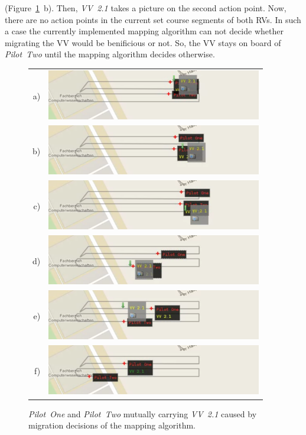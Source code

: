 (Figure~\ref{fig:demo2mig02}~b). Then, \textit{VV~2.1} takes a picture on the second action point.  
%
Now, there are no action points in the current set course segments of both \acp{RV}. In such a case
the currently implemented mapping algorithm can not decide whether migrating the \ac{VV} would be
benificious or not. So, the \ac{VV} stays on board of \textit{Pilot~Two} until the mapping algorithm
decides otherwise.
%
\begin{figure}[h]
	\begin{center}
		\begin{tabular}{rr}
			a)&{\includegraphics[width=9.4cm]{ese-demo2-3.png}} \\
			b)&{\includegraphics[width=9.4cm]{ese-demo2-4.png}} \\
			c)&{\includegraphics[width=9.4cm]{ese-demo2-5.png}} \\
			d)&{\includegraphics[width=9.4cm]{ese-demo2-6.png}} \\
			e)&{\includegraphics[width=9.4cm]{ese-demo2-7.png}} \\
			f)&{\includegraphics[width=9.4cm]{ese-demo2-8.png}}
		\end{tabular}
	\end{center}
	\caption{\textit{Pilot~One} and \textit{Pilot~Two} mutually carrying \textit{VV~2.1}
		caused by migration decisions of the mapping algorithm.\label{fig:demo2mig02}}
\end{figure}
